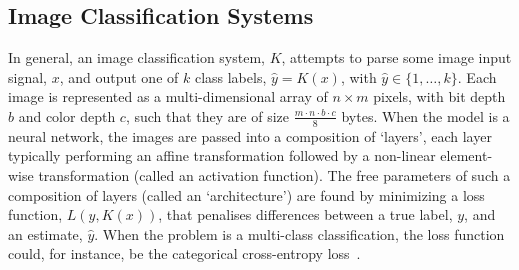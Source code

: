 \documentclass[journal]{IEEEtran}
\newcommand{\cm}[1]{\textit{{\color{blue}#1}}}
\begin{document}
\subsection{Image Classification Systems}
\label{classification}
In general, an image classification system, $K$, attempts to parse some image input signal, $x$, and output one of $k$ class labels, $\hat{y} = K(x)$, with $\hat{y} \in \{1,\ldots,k\}$. Each image is represented as a multi-dimensional array of $n\times m$ pixels, with bit depth $b$ and color depth $c$, such that they are of size $\frac{m \cdot n \cdot b \cdot c}{8}$ bytes. When the model is a neural network, the images are passed into a composition of `layers', each layer typically performing an affine transformation followed by a non-linear element-wise transformation (called an activation function). The free parameters of such a composition of layers (called an `architecture') are found by minimizing a loss function, $L(y,K(x))$, that penalises differences between a true label, $y$, and an estimate, $\hat{y}$. When the problem is a multi-class classification, the loss function could, for instance, be the categorical cross-entropy loss~\cite{biggio_evasion_2013, tsipras_robustness_2019, croce_reliable_2020, carlini_towards_2017}. 




\end{document}
